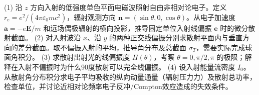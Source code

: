 (1) 沿 \(z\) 方向入射的低强度单色平面电磁波照射自由非相对论电子。定义 \(r_e=e^2/(4\pi\varepsilon_0mc^2)\)，辐射观测方向 \(\boldsymbol n=(\sin\theta,0,\cos\theta)\)。从电子加速度 \(\boldsymbol a=-e\boldsymbol E/m\) 和远场偶极辐射的横向投影，推导固定单位入射线偏振 \(\boldsymbol e\) 时的微分散射截面。
(2) 对入射波沿 \(x\)、沿 \(y\) 的两种正交线偏振分别求散射平面内与垂直方向的差分截面。取不偏振入射的平均，推导角分布及总截面 \(\sigma_T\)，需要实际完成球面角积分。
(3) 求散射出射光的线偏振度 \(\Pi(\theta)\)，考察 \(\theta=0,\pi/2,\pi\) 的极限；解释在入射不偏振时为什么90度散射可以完全线偏振。
(4) 设入射能量流密度 \(I_0\)。从散射角分布积分求电子平均吸收的纵向动量通量（辐射压力力）及散射总功率，检查单位，并讨论近相对论频率电子反冲/Compton效应造成的失效条件。
